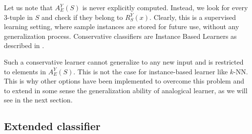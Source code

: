 \documentclass{ecai}
\begin{document}
Let us note that $A_E^Y(S)$ is never explicitly computed. Instead, we look for
every 3-tuple in $S$ and check if they belong to $R_S^Y(x)$.
Clearly, this is a supervised learning setting, where sample instances are
stored for future use, without any generalization process. Conservative
classifiers are Instance Based Learners
as described in \cite{Aggar2014}.

%
%
%

Such a conservative learner cannot generalize to any new input and is
restricted to elements in $A_E^Y(S)$. This is not the case for instance-based
learner like $k$-NN.  This is why other options have been implemented to
overcome this problem and to extend in some sense the generalization ability of
analogical learner, as we will see in the next section.

\subsection{Extended classifier}
\label{EXTENDED_LEARNER}
\end{document}
